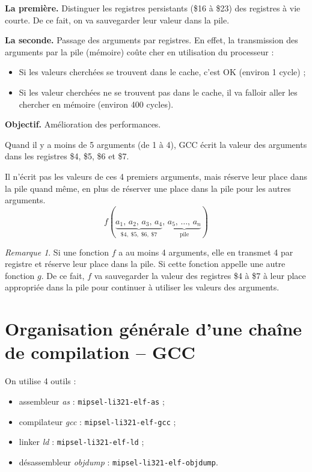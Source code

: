 \documentclass[11pt,english,french]{scrreprt}
\theoremstyle{remark}
\newtheorem*{rem*}{Remarque}
\theoremstyle{definition}
\begin{document}
\textbf{La première.} Distinguer les registres persistants (\$16 à \$23) des registres à vie courte. De ce fait, on va sauvegarder leur valeur dans la pile.

\textbf{La seconde.} Passage des arguments par registres. En effet, la transmission des arguments par la pile (mémoire) coûte cher en utilisation du processeur : \begin{itemize}
	\item Si les valeurs cherchées se trouvent dans le cache, c'est OK (environ 1 cycle) ;
	\item Si les valeur cherchées ne se trouvent pas dans le cache, il va falloir aller les chercher en mémoire (environ 400 cycles).
\end{itemize}
\textbf{Objectif.} Amélioration des performances.

Quand il y a moins de 5 arguments (de 1 à 4), GCC écrit la valeur des arguments dans les registres \$4, \$5, \$6 et \$7.

Il n'écrit pas les valeurs de ces 4 premiers arguments, mais réserve leur place dans la pile quand même, en plus de réserver une place dans la pile pour les autres arguments.
\[
	f(\underbrace{a_{1},\, a_{2},\, a_{3},\, a_{4}}_{\$4,\;\$5,\;\$6,\;\$7},\,\underbrace{a_{5},\,\dots,\, a_{n}}_{\textrm{pile}})
\]

\begin{rem*}
	Si une fonction $f$ a au moins 4 arguments, elle en transmet 4 par registre et réserve leur place dans la pile. Si cette fonction appelle une autre fonction $g$. De ce fait, $f$ va sauvegarder la valeur des registres \$4 à \$7 à leur place appropriée dans la pile pour continuer à utiliser les valeurs des arguments.
\end{rem*}

\vfill

\section{Organisation générale d'une chaîne de compilation -- GCC} %

On utilise 4 outils :\begin{itemize}
	\item assembleur \emph{as} : \lstinline!mipsel-li321-elf-as! ;
	\item compilateur \emph{gcc} : \lstinline!mipsel-li321-elf-gcc! ;
	\item linker \emph{ld} : \lstinline!mipsel-li321-elf-ld! ;
	\item désassembleur \emph{objdump} : \lstinline!mipsel-li321-elf-objdump!.
\end{itemize}
\end{document}
